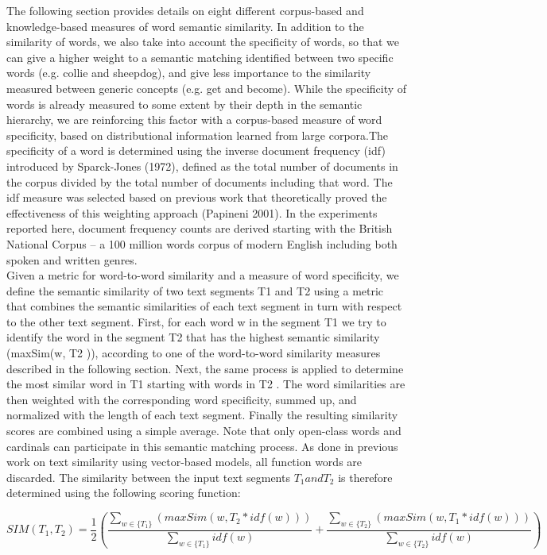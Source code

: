    The following section provides details on eight different corpus-based and knowledge-based measures of word semantic similarity. In addition to the similarity of words, we also take into account the specificity of words, so that we can give a higher weight to a semantic matching identified between two specific words (e.g. collie and sheepdog), and give less importance to the similarity measured between generic concepts (e.g. get and become). While the specificity of words is already measured to some extent by their depth in the semantic hierarchy, we are reinforcing this factor with a corpus-based measure of word specificity, based on distributional information learned from large corpora.The specificity of a word is determined using the inverse document frequency (idf) introduced by Sparck-Jones (1972), defined as the total number of documents in the corpus divided by the total number of documents including that word. The idf measure was selected based on previous work that theoretically proved the effectiveness of this weighting approach (Papineni 2001). In the experiments reported here, document frequency counts are derived starting with the British National Corpus – a 100 million words corpus of modern English including both spoken and written genres.\\
   Given a metric for word-to-word similarity and a measure of word specificity, we define the semantic similarity of two text segments T1 and T2 using a metric that combines the semantic similarities of each text segment in turn with respect to the other text segment. First, for each word w in the segment T1 we try to identify the word in the segment T2 that has the highest semantic similarity (maxSim(w, T2 )), according to one of the word-to-word similarity measures described in the following section. Next, the same process is applied to determine the most similar word in T1 starting with words in T2 . The word similarities are then weighted with the corresponding word specificity, summed up, and normalized with the length of each text segment. Finally the resulting similarity scores are combined using a simple average. Note that only open-class words and cardinals can participate in this semantic matching process. As done in previous work on text similarity using vector-based models, all function words are discarded.
    The similarity between the input text segments $T_1 and T_2$ is therefore determined using the following scoring function:
    
\begin{equation}
SIM({T_{1}},{T_{2}}) =\frac{1}{2}(\frac{\sum_{w\in \{T_1\}} (maxSim(w,T_2 * idf(w)))}{\sum_{w\in \{T_1\}} idf(w)} + \frac{\sum_{w\in \{T_2\}} (maxSim(w,T_1 * idf(w)))}{\sum_{w\in \{T_2\}} idf(w)})
\end{equation}

